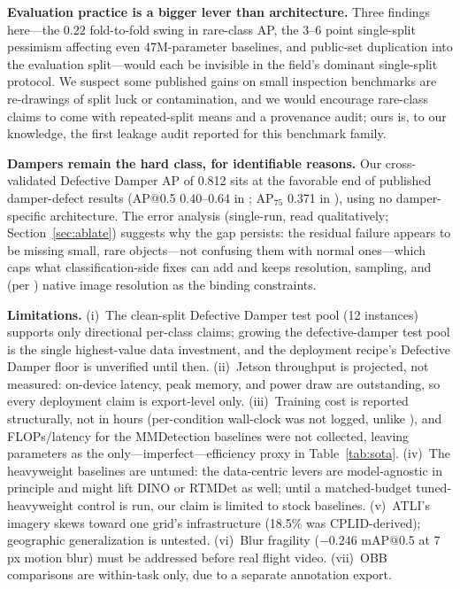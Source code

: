 \documentclass[conference]{IEEEtran}
\makeatletter
\newcommand{\dd}{Defective Damper}
\newcommand{\map}{mAP@0.5}
\makeatother
\begin{document}
\textbf{Evaluation practice is a bigger lever than architecture.} Three findings here---the $0.22$ fold-to-fold swing in rare-class AP, the 3--6 point single-split pessimism affecting even 47M-parameter baselines, and public-set duplication into the evaluation split---would each be invisible in the field's dominant single-split protocol. We suspect some published gains on small inspection benchmarks are re-drawings of split luck or contamination, and we would encourage rare-class claims to come with repeated-split means and a provenance audit; ours is, to our knowledge, the first leakage audit reported for this benchmark family.

\textbf{Dampers remain the hard class, for identifiable reasons.} Our cross-validated \dd{} AP of 0.812 sits at the favorable end of published damper-defect results (AP@0.5 0.40--0.64 in \cite{su2024cessd,zhang2024dsanet}; AP$_{75}$ 0.371 in \cite{zhang2024hcvit}), using no damper-specific architecture. The error analysis (single-run, read qualitatively; Section~\ref{sec:ablate}) suggests why the gap persists: the residual failure appears to be missing small, rare objects---not confusing them with normal ones---which caps what classification-side fixes can add and keeps resolution, sampling, and (per \cite{vieiraesilva2021stnplad}) native image resolution as the binding constraints.

\textbf{Limitations.} (i)~The clean-split \dd{} test pool (12 instances) supports only directional per-class claims; growing the defective-damper test pool is the single highest-value data investment, and the deployment recipe's \dd{} floor is unverified until then. (ii)~Jetson throughput is projected, not measured: on-device latency, peak memory, and power draw are outstanding, so every deployment claim is export-level only. (iii)~Training cost is reported structurally, not in hours (per-condition wall-clock was not logged, unlike \cite{tsai2025atli}), and FLOPs/latency for the MMDetection baselines were not collected, leaving parameters as the only---imperfect---efficiency proxy in Table~\ref{tab:sota}. (iv)~The heavyweight baselines are untuned: the data-centric levers are model-agnostic in principle and might lift DINO or RTMDet as well; until a matched-budget tuned-heavyweight control is run, our claim is limited to stock baselines. (v)~ATLI's imagery skews toward one grid's infrastructure (18.5\% was CPLID-derived); geographic generalization is untested. (vi)~Blur fragility ($-0.246$ \map{} at 7\,px motion blur) must be addressed before real flight video. (vii)~OBB comparisons are within-task only, due to a separate annotation export.
\end{document}

